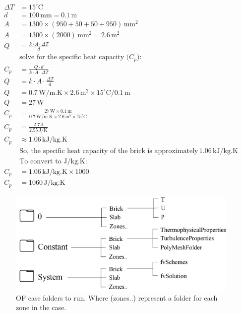 \begin{equation}
\begin{aligned}
\Delta T &= 15^\circ \text{C} \\
d &= 100 \, \text{mm} = 0.1 \, \text{m} \\
A &= 1300 \times (950 + 50 + 50 + 950) \, \text{mm}^2 \\
A &= 1300 \times (2000) \, \text{mm}^2 = 2.6 \, \text{m}^2 \\
Q &= \frac{k \cdot A \cdot \Delta T}{d} \\
&\text{solve for the specific heat capacity ($C_p$):} \\
C_p &= \frac{Q \cdot d}{k \cdot A \cdot \Delta T} \\
Q &= k \cdot A \cdot \frac{\Delta T}{d} \\
Q &= 0.7 \, \text{W/m.K} \times 2.6 \, \text{m}^2 \times 15^\circ \text{C} / 0.1 \, \text{m} \\
Q &= 27 \, \text{W} \\
C_p &= \frac{27 \, \text{W} \times 0.1 \, \text{m}}{0.7 \, \text{W/m.K} \times 2.6 \, \text{m}^2 \times 15^\circ \text{C}} \\
C_p &= \frac{2.7 \, \text{J}}{2.55 \, \text{J/K}} \\
C_p &\approx 1.06 \, \text{kJ/kg.K} \\
&\text{So, the specific heat capacity of the brick is approximately} \, 1.06 \, \text{kJ/kg.K} \\
&\text{To convert to J/kg.K:} \\
C_p &= 1.06 \, \text{kJ/kg.K} \times 1000 \\
C_p &= 1060 \, \text{J/kg.K}
\end{aligned}
\end{equation}







\begin{figure}[H]
\centering
\includegraphics[width=0.77\columnwidth]{Figures/constc.png}
\hspace{0.7cm}
\caption[OF Case Contents]{OF case folders to run. Where (zones..) represent a folder for each zone in the case.}
\label{constc}
\end{figure}


